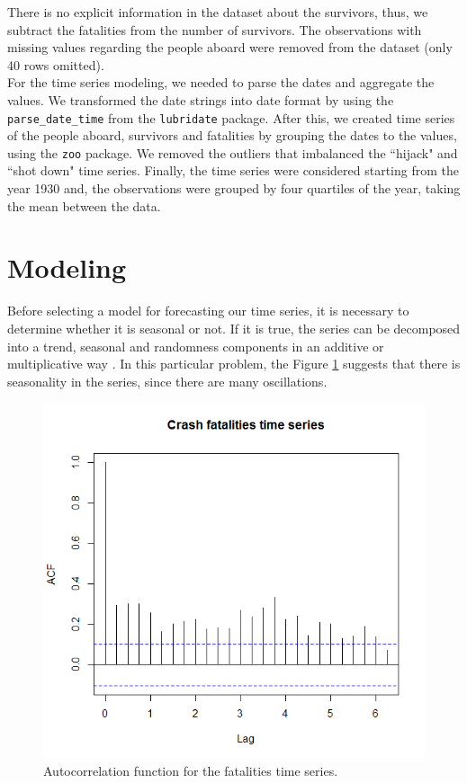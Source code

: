 \documentclass[12pt]{article}
\begin{document}
There is no explicit information in the dataset about the survivors, thus, we subtract the fatalities from the number of survivors. The observations with missing values regarding the people aboard were removed from the dataset (only 40 rows omitted).\\

For the time series modeling, we needed to parse the dates and aggregate the values. We transformed the date strings into date format by using the \texttt{parse\_date\_time} from the \texttt{lubridate} package. After this, we created time series of the people aboard, survivors and fatalities by grouping the dates to the values, using the \texttt{zoo} package. We removed the outliers that imbalanced the  \textquotedblleft hijack" and \textquotedblleft shot down" time series. Finally, the time series were considered starting from the year 1930 and, the observations were grouped by four quartiles of the year, taking the mean between the data.

\section{Modeling}

Before selecting a model for forecasting our time series, it is necessary to determine whether it is seasonal or not. If it is true, the series can be decomposed into a trend, seasonal and randomness components in an additive or multiplicative way \cite{bib:shumway2000time}. In this particular problem, the Figure \ref{fig:acFTS} suggests that there is seasonality in the series, since there are many oscillations.\\

\begin{figure}[H]
	\centering
	\includegraphics[width=0.8\linewidth]{acfFatalities}
	\caption{Autocorrelation function for the fatalities time series.}
	\label{fig:acFTS}
\end{figure}
\end{document}

